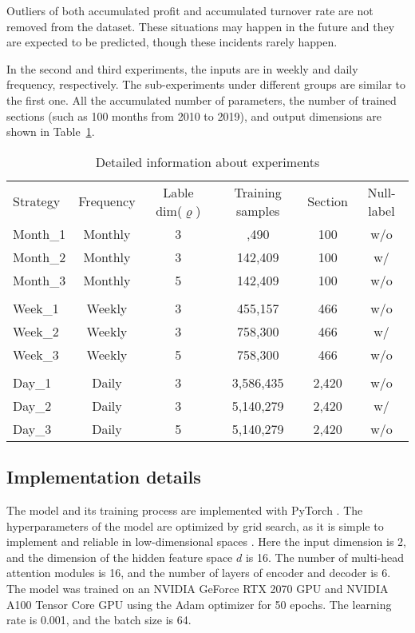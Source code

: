 \documentclass[preprint,12pt]{elsarticle}
\begin{document}
Outliers of both accumulated profit and accumulated turnover rate are not removed from the dataset. These situations may happen in the future and they are expected to be predicted, though these incidents rarely happen.

In the second and third experiments, the inputs are in weekly and daily frequency, respectively. The sub-experiments under different groups are similar to the first one. All the accumulated number of parameters, the number of trained sections (such as 100 months from 2010 to 2019), 
and output dimensions are shown in Table~\ref{para1}.

\begin{table}
\caption{Detailed information about experiments}
\centering
\label{para1}
{
\renewcommand{\arraystretch}{0.5}
\begin{tabular}{l c c c c c}
\toprule
Strategy & Frequency & Lable dim($\varrho$) & Training samples & Section &  Null-label\\ [0.5ex] 
Month\_1 & Monthly & 3 & \enskip 85,490 & 100 & w/o  \\ [0.5ex] 
Month\_2 & Monthly & 3 & 142,409 & 100 & w/ \\ [0.5ex] 
Month\_3 & Monthly & 5 & 142,409 & 100 & w/o    \\ [0.5ex] 
\hline \\
Week\_1 & Weekly & 3 & 455,157 & 466 &  w/o \\ [0.5ex] 
Week\_2 & Weekly & 3 & 758,300 & 466 &  w/ \\ [0.5ex] 
Week\_3 & Weekly & 5 & 758,300 & 466 &  w/o    \\ [0.5ex] 
\hline \\
Day\_1 & Daily & 3 & 3,586,435 & 2,420 & w/o  \\ [0.5ex] 
Day\_2 & Daily & 3 & 5,140,279 & 2,420 & w/ \\ [0.5ex] 
Day\_3 & Daily & 5 & 5,140,279 & 2,420 & w/o  \\ [0.5ex] 
\bottomrule
\end{tabular}
}
\end{table}

\subsection{Implementation details}
The model and its training process are implemented with PyTorch \citep{paszke2019pytorch}. The hyperparameters of the model are optimized by grid search, as it is simple to implement and reliable in low-dimensional spaces \citep{bergstra2012random}. Here the input dimension is 2, and the dimension of the hidden feature space $d$ is 16. The number of multi-head attention modules is 16, and the number of layers of encoder and decoder is 6. The model was trained on an NVIDIA GeForce RTX 2070 GPU and NVIDIA A100 Tensor Core GPU using the Adam optimizer \citep{KingmaB14adam} for 50 epochs. The learning rate is 0.001, and the batch size is 64.
\end{document}
